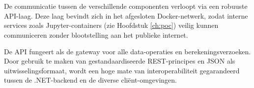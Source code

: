 \section{}
\label{ch:architecture-api}

De communicatie tussen de verschillende componenten verloopt via een robuuste API-laag. Deze laag bevindt zich in het afgesloten Docker-netwerk, zodat interne services zoals Jupyter-containers (zie Hoofdstuk \ref{ch:poc}) veilig kunnen communiceren zonder blootstelling aan het publieke internet.

De API fungeert als de gateway voor alle data-operaties en berekeningsverzoeken. Door gebruik te maken van gestandaardiseerde REST-principes en JSON als uitwisselingsformaat, wordt een hoge mate van interoperabiliteit gegarandeerd tussen de .NET-backend en de diverse cli\"{e}nt-omgevingen.
